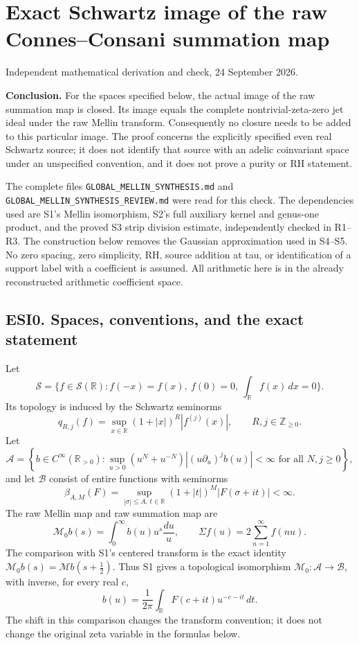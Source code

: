 \section{Exact Schwartz image of the raw Connes--Consani summation
map}\label{exact-schwartz-image-of-the-raw-connesconsani-summation-map}

Independent mathematical derivation and check, 24 September 2026.

\textbf{Conclusion.} For the spaces specified below, the actual image of
the raw summation map is closed. Its image equals the complete
nontrivial-zeta-zero jet ideal under the raw Mellin transform.
Consequently no closure needs to be added to this particular image. The
proof concerns the explicitly specified even real Schwartz source; it
does not identify that source with an adelic coinvariant space under an
unspecified convention, and it does not prove a purity or RH statement.

The complete files \texttt{GLOBAL\_MELLIN\_SYNTHESIS.md} and
\nolinkurl{GLOBAL_MELLIN_SYNTHESIS_REVIEW.md} were read for this check.
The dependencies used are S1's Mellin isomorphism, S2's full auxiliary
kernel and genus-one product, and the proved S3 strip division estimate,
independently checked in R1--R3. The construction below removes the
Gaussian approximation used in S4--S5. No zero spacing, zero simplicity,
RH, source addition at tau, or identification of a support label with a
coefficient is assumed. All arithmetic here is in the already
reconstructed arithmetic coefficient space.

\subsection{ESI0. Spaces, conventions, and the exact
statement}\label{esi0.-spaces-conventions-and-the-exact-statement}

Let \[
\mathcal S=\{f\in\mathcal S(\mathbb R):f(-x)=f(x),\ f(0)=0,\ \int_{\mathbb R}f(x)\,dx=0\}.
\tag{ESI0.1}
\] Its topology is induced by the Schwartz seminorms \[
q_{R,j}(f)=\sup_{x\in\mathbb R}(1+|x|)^R|f^{(j)}(x)|,
\qquad R,j\in\mathbb Z_{\ge0}.
\tag{ESI0.2}
\] Let \[
\mathcal A=\left\{b\in C^\infty(\mathbb R_{>0}):
\sup_{u>0}(u^N+u^{-N})|(u\partial_u)^j b(u)|<\infty
\text{ for all }N,j\ge0\right\},
\tag{ESI0.3}
\] and let \(\mathcal B\) consist of entire functions with seminorms \[
\beta_{A,M}(F)=\sup_{|\sigma|\le A,\,t\in\mathbb R}
(1+|t|)^M|F(\sigma+it)|<\infty.
\tag{ESI0.4}
\] The raw Mellin map and raw summation map are \[
\mathcal M_0b(s)=\int_0^\infty b(u)u^s\frac{du}{u},
\qquad
\Sigma f(u)=2\sum_{n=1}^\infty f(nu).
\tag{ESI0.5}
\] The comparison with S1's centered transform is the exact identity
\(\mathcal M_0b(s)=\mathcal Mb(s+\tfrac12)\). Thus S1 gives a
topological isomorphism \(\mathcal M_0:\mathcal A\to\mathcal B\), with
inverse, for every real \(c\), \[
b(u)=\frac1{2\pi}\int_{\mathbb R}F(c+it)u^{-c-it}\,dt.
\tag{ESI0.6}
\] The shift in this comparison changes the transform convention; it
does not change the original zeta variable in the formulas below.

